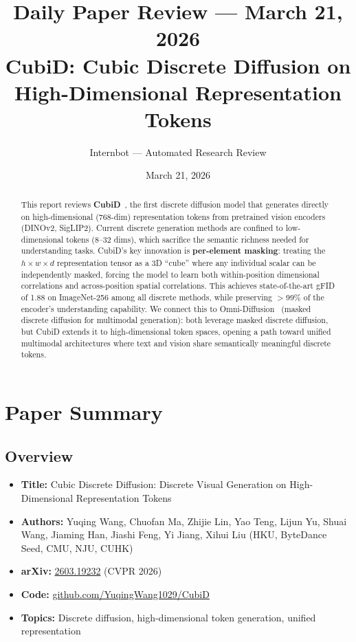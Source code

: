 \documentclass[11pt]{article}
\title{Daily Paper Review --- March 21, 2026\\
\large CubiD: Cubic Discrete Diffusion on\\High-Dimensional Representation Tokens}
\author{Internbot --- Automated Research Review}
\date{March 21, 2026}
\begin{document}
\maketitle

\begin{abstract}
This report reviews \textbf{CubiD}~\cite{cubid}, the first discrete diffusion model that generates directly on high-dimensional (768-dim) representation tokens from pretrained vision encoders (DINOv2, SigLIP2).
Current discrete generation methods are confined to low-dimensional tokens (8--32 dims), which sacrifice the semantic richness needed for understanding tasks.
CubiD's key innovation is \textbf{per-element masking}: treating the $h \times w \times d$ representation tensor as a 3D ``cube'' where any individual scalar can be independently masked, forcing the model to learn both within-position dimensional correlations and across-position spatial correlations.
This achieves state-of-the-art gFID of 1.88 on ImageNet-256 among all discrete methods, while preserving $>$99\% of the encoder's understanding capability.
We connect this to Omni-Diffusion~\cite{omnidiff} (masked discrete diffusion for multimodal generation): both leverage masked discrete diffusion, but CubiD extends it to high-dimensional token spaces, opening a path toward unified multimodal architectures where text and vision share semantically meaningful discrete tokens.
\end{abstract}

\section{Paper Summary}

\subsection{Overview}
\begin{itemize}
    \item \textbf{Title:} Cubic Discrete Diffusion: Discrete Visual Generation on High-Dimensional Representation Tokens
    \item \textbf{Authors:} Yuqing Wang, Chuofan Ma, Zhijie Lin, Yao Teng, Lijun Yu, Shuai Wang, Jiaming Han, Jiashi Feng, Yi Jiang, Xihui Liu (HKU, ByteDance Seed, CMU, NJU, CUHK)
    \item \textbf{arXiv:} \href{https://arxiv.org/abs/2603.19232}{2603.19232} \quad (CVPR 2026)
    \item \textbf{Code:} \href{https://github.com/YuqingWang1029/CubiD}{github.com/YuqingWang1029/CubiD}
    \item \textbf{Topics:} Discrete diffusion, high-dimensional token generation, unified representation
\end{itemize}
\end{document}
